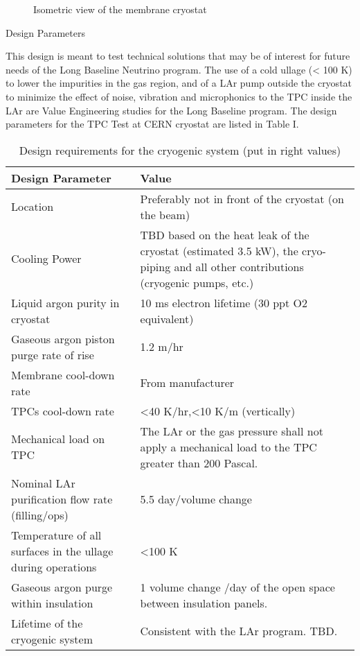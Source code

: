 \begin{figure}
\begin{center}
\caption[Isometric view of cryostat]{\label{fig:cryostat-views} Isometric view of the membrane cryostat}
\end{center}
\end{figure}

Design Parameters

This design is meant to test technical solutions that may be of interest for future needs of the Long Baseline Neutrino program. The use of a cold ullage (< 100 K) to lower the impurities in the gas region, and of a LAr pump outside the cryostat to minimize the effect of noise, vibration and microphonics to the TPC inside the LAr are Value Engineering studies for the Long Baseline program.
The design parameters for the TPC Test at CERN cryostat are listed in Table I.

\begin{table}[htpb]
\caption{Design requirements for the cryogenic system (put in right values)}
\label{tbl:cryogenics-design-parameters}
\centering
\begin{tabular}{|l|l|}
\hline
 Design Parameter & Value \\ \hline
 Location & Preferably not in front of the cryostat (on the beam) \\ \hline
 Cooling Power & TBD based on the heat leak of the cryostat (estimated 3.5 kW), the cryo-piping and all other contributions (cryogenic pumps, etc.) \\ \hline
 Liquid argon purity in cryostat & 10 ms electron lifetime (30 ppt O2 equivalent) \\ 
 Gaseous argon piston purge rate of rise & 1.2 m/hr \\ \hline
 Membrane cool-down rate & From manufacturer \\  \hline
 TPCs cool-down rate & <40 K/hr,<10 K/m (vertically)
 \\ \hline
Mechanical load on TPC & The LAr or the gas pressure shall not apply a mechanical load to the TPC greater than 200 Pascal. \\ \hline
Nominal LAr purification flow rate (filling/ops) & 5.5 day/volume change \\ \hline
 Temperature of all surfaces in the ullage during operations & <100 K \\ 
 Gaseous argon purge within insulation & 1 volume change /day of the open space between insulation panels. \\ \hline
 Lifetime of the cryogenic system & Consistent with the LAr program. TBD. \\ \hline
\end{tabular}
\end{table}

